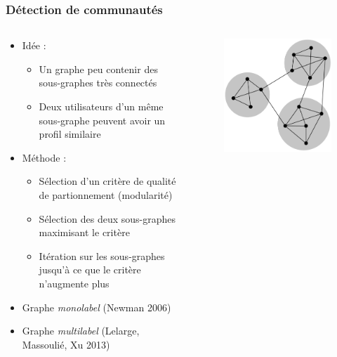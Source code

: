 \documentclass[c]{beamer}
\begin{document}
\begin{frame}
    \frametitle{Détection de communautés}

    \begin{columns}
        \begin{column}{.7\textwidth}
            \begin{itemize}
                \item<1-> Idée :
                    \begin{itemize}
                        \item Un graphe peu contenir des sous-graphes très connectés
                        \item Deux utilisateurs d'un même sous-graphe peuvent avoir un profil
                            similaire
                    \end{itemize}
                \item<2-> Méthode :
                    \begin{itemize}
                        \item Sélection d'un critère de qualité de partionnement (modularité)
                        \item Sélection des deux sous-graphes maximisant le critère
                        \item Itération sur les sous-graphes jusqu'à ce que le critère n'augmente plus
                    \end{itemize}
                \item<3-> Graphe \textit{monolabel} (Newman 2006)
                \item<4-> Graphe \textit{multilabel} (Lelarge, Massoulié, Xu 2013)
            \end{itemize}
        \end{column}
        \begin{column}{.3\textwidth}
            \begin{figure}
                \includegraphics[width=.9\textwidth]{./figures/detection_communaute.png}

\end{figure}
\end{column}
\end{columns}
\end{frame}
\end{document}
